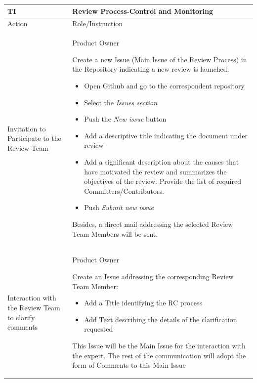 \documentclass{template/openetcs_article}
\begin{document}
\begin{flushleft}
\tablefirsthead{}
\tablehead{}
\tabletail{}
\tablelasttail{}
\begin{supertabular}{|m{3cm}|m{12cm}|}
\hline
{}
TI & 
Review Process-Control and Monitoring
\\\hline
{}
Action &
Role/Instruction
\\\hline
Invitation to Participate to the Review Team &
\begin{description}
\item Product Owner\
\item Create a new Issue (Main Issue of the Review Process) in the Repository indicating a new review is launched:
\begin{itemize}
\item Open Github and go to the correspondent repository
\item Select the {\it Issues section}
\item Push the {\it New issue} button
\item Add a descriptive title indicating the document under review
\item Add a significant description about the causes that have motivated the review and summarizes the objectives of the review. Provide the list of required Committers/Contributors.
\item Push {\it Submit new issue} 
\end{itemize}
\item Besides, a direct mail addressing the selected Review Team Members will be sent.
\end{description} 
\\\hline
Interaction with the Review Team to clarify comments &
\begin{description}
\item Product Owner\
\item Create an Issue addressing the corresponding Review Team Member:
\begin{itemize}
\item Add a Title identifying the RC process
\item Add Text describing the details of the clarification requested
\end{itemize}
\item This Issue will be the Main Issue for the interaction with the expert. The rest of the communication will adopt the form of Comments to this Main Issue
\end{description}
\\\hline

\end{supertabular}
\end{flushleft}
\end{document}
